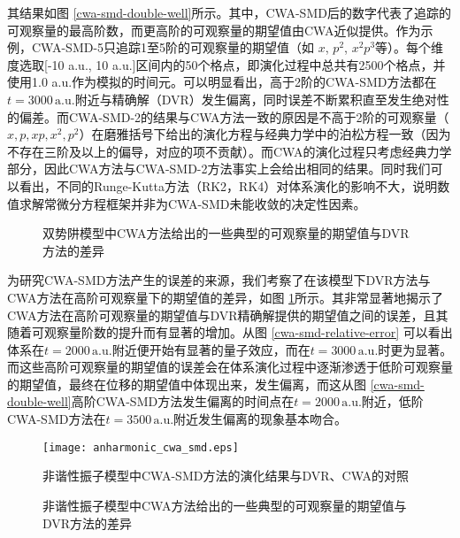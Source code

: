 其结果如图 \ref{cwa-smd-double-well}所示。其中，CWA-SMD后的数字代表了追踪的可观察量的最高阶数，而更高阶的可观察量的期望值由CWA近似提供。作为示例，CWA-SMD-5只追踪1至5阶的可观察量的期望值（如 $x$, $p^2$, $x^2 p^3$等）。每个维度选取[-10 a.u., 10 a.u.]区间内的50个格点，即演化过程中总共有2500个格点，并使用1.0 a.u.作为模拟的时间元。可以明显看出，高于2阶的CWA-SMD方法都在$t=3000 \,\mathrm{a.u.}$附近与精确解（DVR）发生偏离，同时误差不断累积直至发生绝对性的偏差。而CWA-SMD-2的结果与CWA方法一致的原因是不高于2阶的可观察量（$x, p, xp, x^2, p^2$）在磨雅括号下给出的演化方程与经典力学中的泊松方程一致（因为不存在三阶及以上的偏导，对应的项不贡献）。而CWA的演化过程只考虑经典力学部分，因此CWA方法与CWA-SMD-2方法事实上会给出相同的结果。同时我们可以看出，不同的Runge-Kutta方法（RK2，RK4）对体系演化的影响不大，说明数值求解常微分方程框架并非为CWA-SMD未能收敛的决定性因素。

\begin{figure}
\centering
{}
\caption{双势阱模型中CWA方法给出的一些典型的可观察量的期望值与DVR方法的差异}
\label{exp-error}
\end{figure}
为研究CWA-SMD方法产生的误差的来源，我们考察了在该模型下DVR方法与CWA方法在高阶可观察量下的期望值的差异，如图 \ref{exp-error}所示。其非常显著地揭示了CWA方法在高阶可观察量的期望值与DVR精确解提供的期望值之间的误差，且其随着可观察量阶数的提升而有显著的增加。从图 \ref{cwa-smd-relative-error} 可以看出体系在$t=2000 \,\mathrm{a.u.}$附近便开始有显著的量子效应，而在$t=3000 \,\mathrm{a.u.}$时更为显著。而这些高阶可观察量的期望值的误差会在体系演化过程中逐渐渗透于低阶可观察量的期望值，最终在位移的期望值中体现出来，发生偏离，而这从图 \ref{cwa-smd-double-well}高阶CWA-SMD方法发生偏离的时间点在$t=2000 \,\mathrm{a.u.}$附近，低阶CWA-SMD方法在$t=3500 \,\mathrm{a.u.}$附近发生偏离的现象基本吻合。

\begin{figure}
\centering
\texttt{[image: anharmonic\_cwa\_smd.eps]}
\caption{非谐性振子模型中CWA-SMD方法的演化结果与DVR、CWA的对照}
\label{cwa-smd-anharmonic}
\end{figure}

\begin{figure}
\centering
{}
\caption{非谐性振子模型中CWA方法给出的一些典型的可观察量的期望值与DVR方法的差异}
\label{exp-error-anharmonic}
\end{figure}

